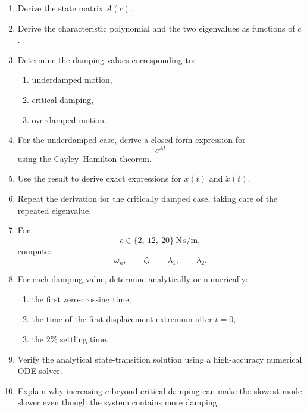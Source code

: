 \begin{enumerate}
    \item Derive the state matrix $A(c)$.

    \item Derive the characteristic polynomial and the two eigenvalues as
    functions of $c$.

    \item Determine the damping values corresponding to:
    \begin{enumerate}
        \item underdamped motion,
        \item critical damping,
        \item overdamped motion.
    \end{enumerate}

    \item For the underdamped case, derive a closed-form expression for
    \begin{equation}
    e^{At}
    \end{equation}
    using the Cayley--Hamilton theorem.

    \item Use the result to derive exact expressions for $x(t)$ and
    $\dot{x}(t)$.

    \item Repeat the derivation for the critically damped case, taking care
    of the repeated eigenvalue.

    \item For
    \begin{equation}
    c\in\{2,\ 12,\ 20\}~\mathrm{N\,s/m},
    \end{equation}
    compute:
    \begin{equation}
    \omega_n,
    \qquad
    \zeta,
    \qquad
    \lambda_1,
    \qquad
    \lambda_2.
    \end{equation}

    \item For each damping value, determine analytically or numerically:
    \begin{enumerate}
        \item the first zero-crossing time,
        \item the time of the first displacement extremum after $t=0$,
        \item the $2\%$ settling time.
    \end{enumerate}

    \item Verify the analytical state-transition solution using a
    high-accuracy numerical ODE solver.

    \item Explain why increasing $c$ beyond critical damping can make the
    slowest mode slower even though the system contains more damping.
\end{enumerate}


